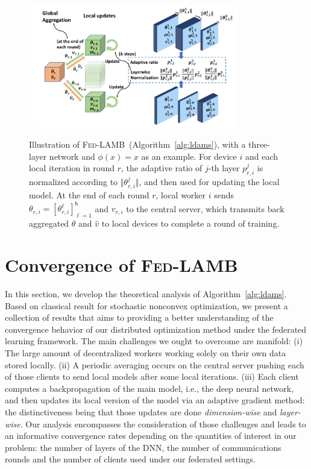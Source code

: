 \documentclass[11pt]{article}
\def\tot{\mathsf{h}}
\newcommand{\algo}{\textsc{Fed-LAMB}}
\begin{document}
\begin{figure}[t]
\centering
\mbox{
        \includegraphics[width=0.8\textwidth]{new_figure/plot1.pdf}
}
\vspace{0.1in}
	\caption{Illustration of \algo\ (Algorithm~\ref{alg:ldams}), with a three-layer network and $\phi(x)=x$ as an example. %
		For device $i$ and each local iteration in round $r$, the adaptive ratio of $j$-th layer $p_{r,i}^j$ is normalized according to $\Vert \theta_{r,i}^j\Vert$, and then used for updating the local model. 
	At the end of each round $r$, local worker $i$ sends $\theta_{r,i} =  [\theta_{r,i}^{\ell}]_{\ell =1}^{\tot}$ and $v_{r,i}$ to the central server, which transmits back aggregated $\theta$ and $\hat v$ to local devices to complete a round of training.}
	\label{fig:illustrate}
\end{figure}


\section{Convergence of \algo}\label{sec:theory}
In this section, we develop the theoretical analysis of Algorithm~\ref{alg:ldams}.  Based on classical result for stochastic nonconvex optimization, we present a collection of results that aims to providing a better understanding of the convergence behavior of our distributed optimization method under the federated learning framework.
The main challenges we ought to overcome are manifold:
(i) The large amount of decentralized workers working solely on their own data stored locally. 
(ii) A periodic averaging occurs on the central server pushing each of those clients to send local models after some local iterations. 
(iii) Each client computes a backpropagation of the main model, i.e., the deep neural network, and then updates its local version of the model via an adaptive gradient method: the distinctiveness being that those updates are done \emph{dimension-wise} and \emph{layer-wise}.
Our analysis encompasses the consideration of those challenges and leads to an informative convergence rates depending on the quantities of interest in our problem: the number of layers of the DNN, the number of communications rounds and the number of clients used under our federated settings.
\end{document}
